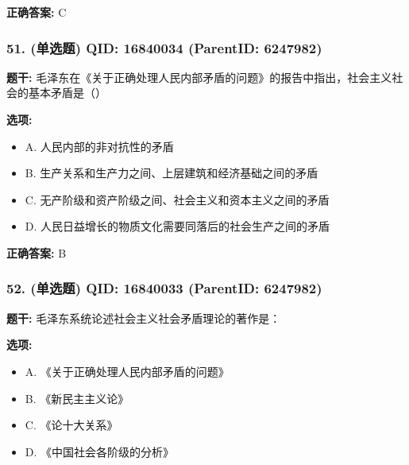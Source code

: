 \documentclass[12pt,UTF8]{ctexart}
\begin{document}
\textbf{正确答案:}
C

\vspace{0.3em}\hrulefill\vspace{0.7em}

\subsubsection*{51. (单选题) \small QID: 16840034 (ParentID: 6247982)}

\textbf{题干:}
毛泽东在《关于正确处理人民内部矛盾的问题》的报告中指出，社会主义社会的基本矛盾是（）



\textbf{选项:}
\begin{itemize}[leftmargin=*]

  \item A. 人民内部的非对抗性的矛盾

  \item B. 生产关系和生产力之间、上层建筑和经济基础之间的矛盾

  \item C. 无产阶级和资产阶级之间、社会主义和资本主义之间的矛盾

  \item D. 人民日益增长的物质文化需要同落后的社会生产之间的矛盾

\end{itemize}

\textbf{正确答案:}
B

\vspace{0.3em}\hrulefill\vspace{0.7em}

\subsubsection*{52. (单选题) \small QID: 16840033 (ParentID: 6247982)}

\textbf{题干:}
毛泽东系统论述社会主义社会矛盾理论的著作是：



\textbf{选项:}
\begin{itemize}[leftmargin=*]

  \item A. 《关于正确处理人民内部矛盾的问题》

  \item B. 《新民主主义论》

  \item C. 《论十大关系》

  \item D. 《中国社会各阶级的分析》

\end{itemize}
\end{document}
